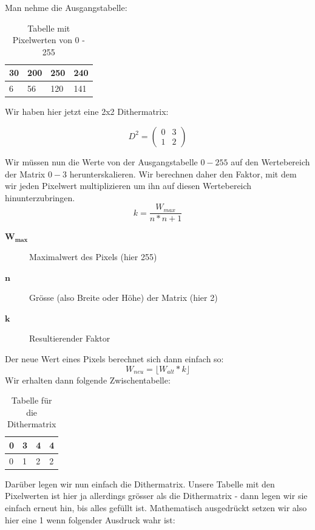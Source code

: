 Man nehme die Ausgangstabelle:

\begin{table}[!ht]
	\centering
	\caption{Tabelle mit Pixelwerten von 0 - 255}
	\label{tbl:ausgangstabelle}
	\begin{tabular}{|l|l|l|l|}
		\hline
		30 & 200 & 250 & 240 \\ \hline
		6  & 56  & 120 & 141 \\ 
		\hline
	\end{tabular}
\end{table}

Wir haben hier jetzt eine 2x2 Dithermatrix:

\begin{displaymath}
D^2 = \begin{pmatrix}
0 & 3 \\
1 & 2
\end{pmatrix}
\end{displaymath}

Wir müssen nun die Werte von der Ausgangstabelle \(0-255\) auf den Wertebereich der Matrix \(0-3\) herunterskalieren. Wir berechnen daher den Faktor, mit dem wir jeden Pixelwert multiplizieren um ihn auf diesen Wertebereich hinunterzubringen.
\begin{displaymath}
k = \frac{W_{max}}{n*n+1}
\end{displaymath}

\begin{description}
	\item[\(\mathbf{W_{max}}\)] Maximalwert des Pixels (hier 255)
	\item[\(\mathbf{n}\)] Grösse (also Breite oder Höhe) der Matrix (hier 2)
	\item[\(\mathbf{k}\)] Resultierender Faktor
\end{description}
Der neue Wert eines Pixels berechnet sich dann einfach so:
\begin{displaymath}
W_{neu} = \lfloor W_{alt} * k \rfloor
\end{displaymath}
Wir erhalten dann folgende Zwischentabelle:

\begin{table}[!ht]
	\centering
	\caption{Tabelle für die Dithermatrix}
	\label{tbl:zwischentabelle}
	\begin{tabular}{|l|l|l|l|}
		\hline
		0 & 3 & 4 & 4 \\ \hline
		0  & 1  & 2 & 2 \\ 
		\hline
	\end{tabular}
\end{table}
Darüber legen wir nun einfach die Dithermatrix. Unsere Tabelle mit den Pixelwerten ist hier ja allerdings grösser als die Dithermatrix - dann legen wir sie einfach erneut hin, bis alles gefüllt ist. Mathematisch ausgedrückt setzen wir also hier eine 1 wenn folgender Ausdruck wahr ist:

